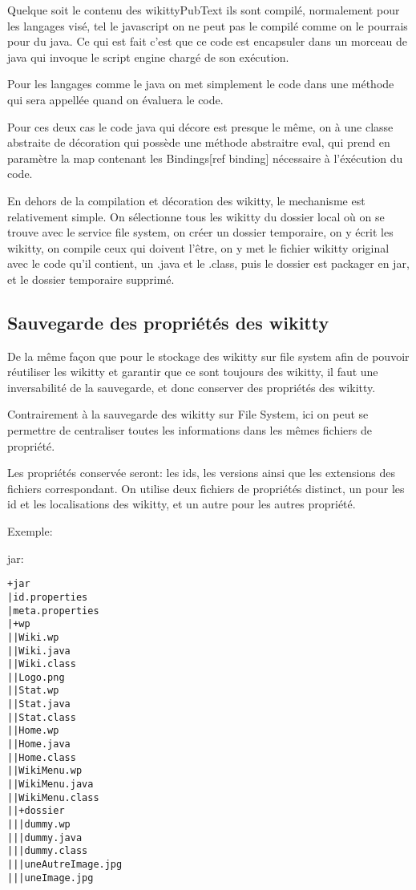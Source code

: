 Quelque soit le contenu des wikittyPubText ils sont compilé, normalement pour les
langages visé, tel le javascript on ne peut pas le compilé comme on le pourrais 
pour du java. Ce qui est fait c'est que ce code est encapsuler dans un morceau
de java qui invoque le script engine chargé de son exécution. 

Pour les langages comme le java on met simplement le code dans une méthode qui 
sera appellée quand on évaluera le code.

Pour ces deux cas le code java qui décore est presque le même, on à une classe
abstraite de décoration qui possède une méthode abstraitre eval, qui prend en 
paramètre la map contenant les Bindings[ref binding] nécessaire à l'éxécution 
du code.


En dehors de la compilation et décoration des wikitty, le mechanisme est 
relativement simple. On sélectionne tous les wikitty du dossier local où on
se trouve avec le service file system, on créer un dossier temporaire, 
on y écrit les wikitty, on compile ceux qui doivent l'être, on y met le fichier
wikitty original avec le code qu'il contient, un .java et le .class, puis le 
dossier est packager en jar, et le dossier temporaire supprimé.


\subsection{Sauvegarde des propriétés des wikitty}

De la même façon que pour le stockage des wikitty sur file system afin de 
pouvoir réutiliser les wikitty et garantir que ce sont toujours des wikitty,
il faut une inversabilité de la sauvegarde, et donc conserver des propriétés des
wikitty.

Contrairement à la sauvegarde des wikitty sur File System, ici on peut se 
permettre de centraliser toutes les informations dans les mêmes fichiers de 
propriété. 

Les propriétés conservée seront: les ids, les versions ainsi que les extensions
des fichiers correspondant. On utilise deux fichiers de propriétés distinct, 
un pour les id et les localisations des wikitty, et un autre pour les autres 
propriété.

Exemple: %

jar:
\begin{verbatim}
+jar
|id.properties
|meta.properties
|+wp
||Wiki.wp
||Wiki.java
||Wiki.class
||Logo.png
||Stat.wp
||Stat.java
||Stat.class
||Home.wp
||Home.java
||Home.class
||WikiMenu.wp
||WikiMenu.java
||WikiMenu.class
||+dossier
|||dummy.wp
|||dummy.java
|||dummy.class
|||uneAutreImage.jpg
|||uneImage.jpg
\end{verbatim}


